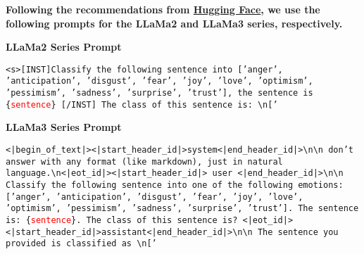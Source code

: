 \begin{tcolorbox}[colback=white, colframe=black, coltitle=white, colbacktitle=black,
    title={Prompt for Dynamic Decoding Strategy}, boxrule=0.5mm, sharp corners]

    \noindent \textbf{Following the recommendations from \href{https://huggingface.co/meta-llama/Llama-2-7b-chat-hf}{Hugging Face}, we use the following prompts for the LLaMa2 and LLaMa3 series, respectively.}

    \vspace{10pt}

    \noindent \textbf{LLaMa2 Series Prompt}


    \noindent \texttt{<s>[INST]Classify the following sentence into ['anger', 'anticipation', 'disgust', 'fear', 'joy', 'love', 'optimism', 'pessimism', 'sadness', 'surprise', 'trust'], the sentence is \{\textcolor{red}{sentence}\} [/INST] The class of this sentence is: \textbackslash n['}


    \vspace{10pt}

    \noindent \textbf{LLaMa3 Series Prompt}


    \noindent \texttt{<|begin\_of\_text|><|start\_header\_id|>system<|end\_header\_id|>\textbackslash n\textbackslash n don't answer with any format (like markdown), just in natural language.\textbackslash n<|eot\_id|><|start\_header\_id|> user <|end\_header\_id|>\textbackslash n\textbackslash n Classify the following sentence into one of the following emotions: ['anger', 'anticipation', 'disgust', 'fear', 'joy', 'love', 'optimism', 'pessimism', 'sadness', 'surprise', 'trust']. The sentence is: \{\textcolor{red}{sentence}\}. The class of this sentence is? <|eot\_id|><|start\_header\_id|>assistant<|end\_header\_id|>\textbackslash n\textbackslash n The sentence you provided is classified as \textbackslash n['}


\end{tcolorbox}




    
